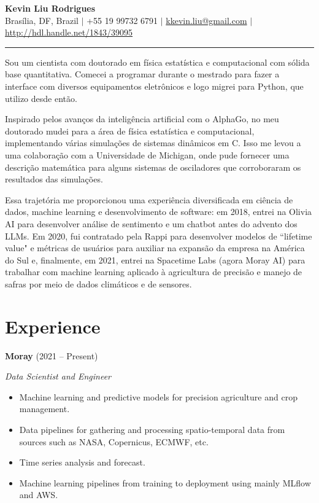 \documentclass[10pt,a4paper]{article}
\begin{document}
\begin{center}
    {\LARGE \textbf{Kevin Liu Rodrigues}}  \\
    \vspace{2pt}
    Brasília, DF, Brazil $|$ +55 19 99732 6791  $|$ \href{mailto:kkevin.liu@gmail.com}{kkevin.liu@gmail.com} $|$
	\href{http://hdl.handle.net/1843/39095}{http://hdl.handle.net/1843/39095}
\end{center}

\noindent\rule{\textwidth}{0.4pt} Sou um cientista com doutorado em física estatística e computacional com sólida base
quantitativa. Comecei a programar durante o mestrado para fazer a interface com diversos equipamentos
eletrônicos e logo migrei para Python, que utilizo desde então.

Inspirado pelos avanços da inteligência artificial com o AlphaGo, no meu doutorado mudei para a área de física
estatística e computacional, implementando várias simulações de sistemas dinâmicos em C. Isso me levou a uma colaboração
com a Universidade de Michigan, onde pude fornecer uma descrição matemática para alguns sistemas de osciladores que
corroboraram os resultados das simulações.

Essa trajetória me proporcionou uma experiência diversificada em ciência de dados, machine learning e desenvolvimento de
software: em 2018, entrei na Olivia AI para desenvolver análise de sentimento e um chatbot antes do advento dos LLMs. Em
2020, fui contratado pela Rappi para desenvolver modelos de ``lifetime value" e métricas de usuários para auxiliar na
expansão da empresa na América do Sul e, finalmente, em 2021, entrei na Spacetime Labs (agora Moray AI) para trabalhar
com machine learning aplicado à agricultura de precisão e manejo de safras por meio de dados climáticos e de sensores.

\section{Experience}

\textbf{Moray} (2021 -- Present)

\textit{Data Scientist and Engineer} 
\begin{itemize}[noitemsep, topsep=0pt]
    \item Machine learning and predictive models for precision agriculture and crop management.
    \item Data pipelines for gathering and processing spatio-temporal data from sources such as NASA, Copernicus, ECMWF, etc.
	\item Time series analysis and forecast.
    \item Machine learning pipelines from training to deployment using mainly MLflow and AWS.
\end{itemize}
\end{document}
